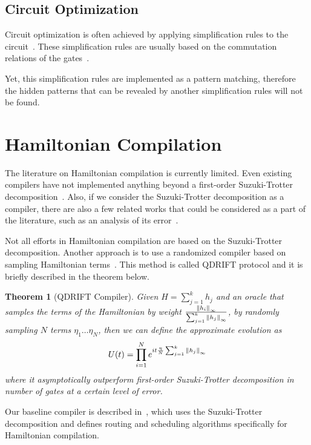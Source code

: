 \documentclass{report}
\newtheorem{theorem}{Theorem}
\begin{document}
\subsection{Circuit Optimization}

Circuit optimization is often achieved by applying simplification rules to the circuit~\cite{pointing2021}. These simplification rules are usually based on the commutation relations of the gates~\cite{itoko2019}.

Yet, this simplification rules are implemented as a pattern matching, therefore the hidden patterns that can be revealed by another simplification rules will not be found.

\section{Hamiltonian Compilation}

The literature on Hamiltonian compilation is currently limited. Even existing compilers have not implemented anything beyond a first-order Suzuki-Trotter decomposition~\cite{sivarajah2021, qiskit2023}. Also, if we consider the Suzuki-Trotter decomposition as a compiler, there are also a few related works that could be considered as a part of the literature, such as an analysis of its error~\cite{childs2021}.

Not all efforts in Hamiltonian compilation are based on the Suzuki-Trotter decomposition. Another approach is to use a randomized compiler based on sampling Hamiltonian terms~\cite{campbell2019}. This method is called QDRIFT protocol and it is briefly described in the theorem below.

\begin{theorem}[QDRIFT Compiler]
  Given $H = \sum_{j=1}^k h_j$ and an oracle that samples the terms of the Hamiltonian by weight $\frac{\norm{h_i}_\infty}{\sum_{j=1}^k \norm{h_j}_\infty}$, by randomly sampling $N$ terms $\eta_1 \dots \eta_N$, then we can define the approximate evolution as
  \begin{equation}
    U(t) = \prod_{i=1}^N e^{it\frac{\eta}{N}\sum_{j=1}^k \norm{h_j}_\infty}
  \end{equation}
  where it asymptotically outperform first-order Suzuki-Trotter decomposition in number of gates at a certain level of error.
\end{theorem}

Our baseline compiler is described in~\cite{lao2021}, which uses the Suzuki-Trotter decomposition and defines routing and scheduling algorithms specifically for Hamiltonian compilation.
\end{document}
